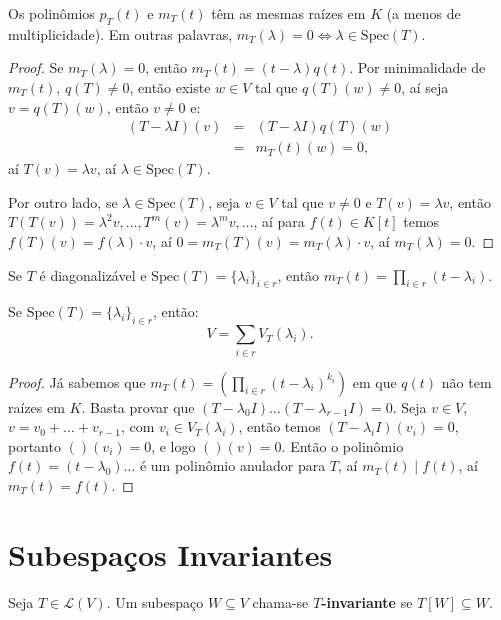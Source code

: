 \documentclass[11pt,twoside,a4paper]{book}
\begin{document}
\begin{teorema}
Os polinômios $p_T(t)$ e $m_T(t)$ têm as mesmas raízes em $K$ (a menos de multiplicidade). Em outras palavras, $m_T(\lambda)=0\Leftrightarrow\lambda\in\mathrm{Spec}(T)$.
\end{teorema}
\begin{proof}
Se $m_T(\lambda)=0$, então $m_T(t)=(t-\lambda)q(t)$. Por minimalidade de $m_T(t)$, $q(T)\neq 0$, então existe $w\in V$ tal que $q(T)(w)\neq 0$, aí seja $v=q(T)(w)$, então $v\neq 0$ e:
\[
\begin{array}{rcl}
(T-\lambda I)(v)&=&(T-\lambda I)q(T)(w)\\&=&m_T(t)(w)=0,
\end{array}
\]
aí $T(v)=\lambda v$, aí $\lambda\in\mathrm{Spec}(T)$.

\medskip
\noindent
Por outro lado, se $\lambda\in\mathrm{Spec}(T)$, seja $v\in V$ tal que $v\neq 0$ e $T(v)=\lambda v$, então $T(T(v))=\lambda^2 v,\dots,T^m(v)=\lambda^m v,\dots$, aí para $f(t)\in K[t]$ temos $f(T)(v)=f(\lambda)\cdot v$, aí $0=m_T(T)(v)=m_T(\lambda)\cdot v$, aí $m_T(\lambda)=0$.
\end{proof}

\begin{corolario}
Se $T$ é diagonalizável e $\mathrm{Spec}(T)=\{\lambda_i\}_{i\in r}$, então $m_T(t)=\prod_{i\in r}(t-\lambda_i)$.
\end{corolario}

\noindent
Se $\mathrm{Spec}(T)=\{\lambda_i\}_{i\in r}$, então:
\[
V=\sum_{i\in r}V_T(\lambda_i).
\]

\begin{proof}
Já sabemos que $m_T(t)=\left(\prod_{i\in r}(t-\lambda_i)^{k_i}\right)$ em que $q(t)$ não tem raízes em $K$. Basta provar que $(T-\lambda_0 I)\dots(T-\lambda_{r-1} I)=0$. Seja $v\in V$, $v=v_0+\dots+v_{r-1}$, com $v_i\in V_T(\lambda_i)$, então temos $(T-\lambda_i I)(v_i)=0$, portanto $()(v_i)=0$, e logo $()(v)=0$. Então o polinômio $f(t)=(t-\lambda_0)\dots$ é um polinômio anulador para $T$, aí $m_T(t)\mid f(t)$, aí $m_T(t)=f(t)$.
\end{proof}

\section{Subespaços Invariantes}

\begin{definicao}
Seja $T\in\mathcal{L}(V)$. Um subespaço $W\subseteq V$ chama-se \textbf{$T$-invariante} se $T[W]\subseteq W$.
\end{definicao}
\end{document}
